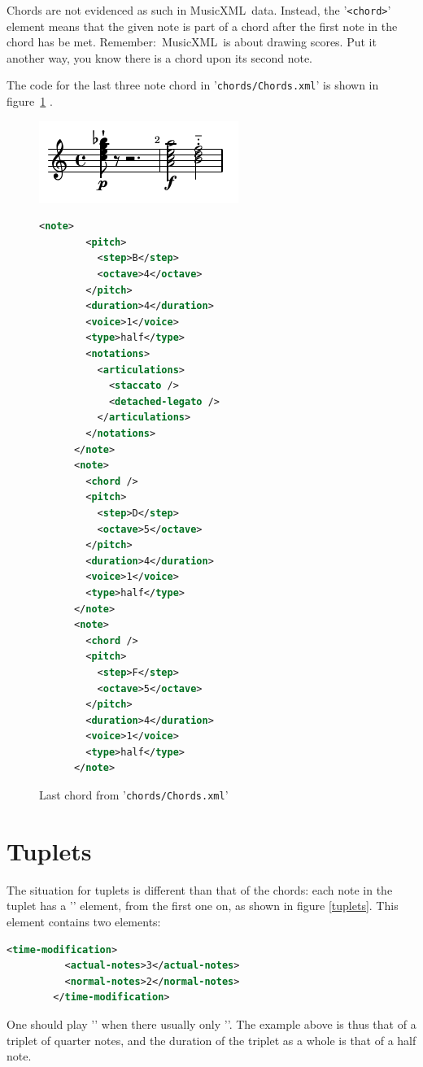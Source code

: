 \documentclass[12pt,a4paper]{article}
\newcommand{\mxml}{MusicXML}
\begin{document}
Chords are not evidenced as such in \mxml\ data. Instead, the {'\tt <chord>}' element means that the given note is part of a chord after the first note in the chord has be met. Remember:~\mxml\ is about drawing scores. Put it another way, you know there is a chord upon its second note.

The code for the last three note chord in {'\tt chords/Chords.xml}' is shown in figure~\ref{chords} .

\begin{figure}
\caption{Last chord from {'\tt chords/Chords.xml}'}\label{chords}
\includegraphics{Chords.png}

\begin{lstlisting}[language=XML]
      <note>
        <pitch>
          <step>B</step>
          <octave>4</octave>
        </pitch>
        <duration>4</duration>
        <voice>1</voice>
        <type>half</type>
        <notations>
          <articulations>
            <staccato />
            <detached-legato />
          </articulations>
        </notations>
      </note>
      <note>
        <chord />
        <pitch>
          <step>D</step>
          <octave>5</octave>
        </pitch>
        <duration>4</duration>
        <voice>1</voice>
        <type>half</type>
      </note>
      <note>
        <chord />
        <pitch>
          <step>F</step>
          <octave>5</octave>
        </pitch>
        <duration>4</duration>
        <voice>1</voice>
        <type>half</type>
      </note>
\end{lstlisting}
\end{figure}

\section{Tuplets}

The situation for tuplets is different than that of the chords: each note in the tuplet has a {'\tt <time-modification>}' element, from the first one on, as shown in figure \ref{tuplets}. This element contains two elements:
\begin{lstlisting}[language=XML]
        <time-modification>
          <actual-notes>3</actual-notes>
          <normal-notes>2</normal-notes>
        </time-modification>
\end{lstlisting}
One should play {'\tt <actual-notes>}' when there usually only {'\tt <normal-notes>}'. The example above is thus that of a triplet of quarter notes, and the duration of the triplet as a whole is that of a half note.
\end{document}
